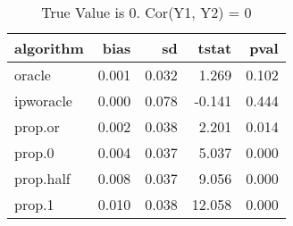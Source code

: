 \begin{table}[h!]

\caption{True Value is 0. Cor(Y1, Y2) = 0}
\centering
\begin{tabular}[t]{lrrrr}
\toprule
algorithm & bias & sd & tstat & pval\\
\midrule
oracle & 0.001 & 0.032 & 1.269 & 0.102\\
ipworacle & 0.000 & 0.078 & -0.141 & 0.444\\
prop.or & 0.002 & 0.038 & 2.201 & 0.014\\
prop.0 & 0.004 & 0.037 & 5.037 & 0.000\\
prop.half & 0.008 & 0.037 & 9.056 & 0.000\\
\addlinespace
prop.1 & 0.010 & 0.038 & 12.058 & 0.000\\
\bottomrule
\end{tabular}
\end{table}
